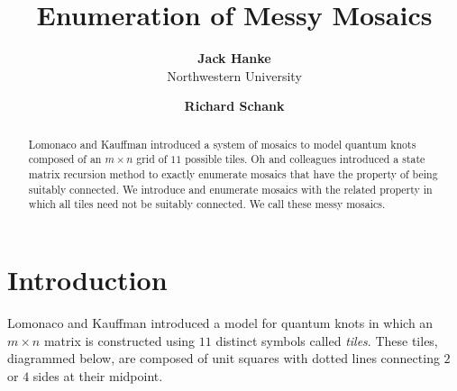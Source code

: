 \documentclass[12pt]{article}
\date{}
\author{
    \textbf{Jack Hanke}\\
    Northwestern University
    \and
    \textbf{Richard Schank}\\
    }
\title{\textbf{Enumeration of Messy Mosaics}}
\theoremstyle{plain}
\theoremstyle{definition}
\theoremstyle{remark}
\theoremstyle{definition}
\newcommand{\cell}[4]{ \draw[thick] ( #1 , #2 ) rectangle ( #3 , #4 );}
\newcommand{\cellA}[4]{\draw[red, thick, densely dotted] ( #1 + 0.5 , #2 ) arc(0:90:{0.5}); \draw[thick] ( #1 , #2 ) rectangle ( #3 , #4 );}
\newcommand{\cellB}[4]{\draw[red, thick, densely dotted] ( #1 + 1 , #2 + 0.5 ) arc(90:180:{0.5}); \draw[thick] ( #1 , #2 ) rectangle ( #3 , #4 );}
\newcommand{\cellC}[4]{\draw[red, thick, densely dotted] ( #1 + 0.5, #2 + 1 ) arc(180:270:{0.5}); \draw[thick] ( #1 , #2 ) rectangle ( #3 , #4 );}
\newcommand{\cellD}[4]{\draw[red, thick, densely dotted] ( #1 , #2 + 0.5 ) arc(-90:0:{0.5}); \draw[thick] ( #1 , #2 ) rectangle ( #3 , #4 );}
\newcommand{\cellE}[4]{\draw[red, thick, densely dotted] (#3, #4 * 0.5 + #2 * 0.5) -- (#1, #4 * 0.5 + #2 * 0.5); \draw[thick] ( #1 , #2 ) rectangle ( #3 , #4 );}
\newcommand{\cellF}[4]{\draw[red, thick, densely dotted] (#3 * 0.5 + #1 * 0.5 , #2) -- (#3 * 0.5 + #1 * 0.5 , #4); \draw[thick] ( #1 , #2 ) rectangle ( #3 , #4 );}
\newcommand{\cellG}[4]{\draw[red, thick, densely dotted] ( #1 + 0.5 , #2 ) arc(0:90:{0.5}); \draw[red, thick, densely dotted] ( #1 + 0.5, #2 + 1 ) arc(180:270:{0.5}); \draw[thick] ( #1 , #2 ) rectangle ( #3 , #4 );}
\newcommand{\cellH}[4]{\draw[red, thick, densely dotted] ( #1 , #2 + 0.5 ) arc(-90:0:{0.5}); \draw[red, thick, densely dotted] ( #1 + 1 , #2 + 0.5 ) arc(90:180:{0.5}); \draw[thick] ( #1 , #2 ) rectangle ( #3 , #4 );}
\newcommand{\cellI}[4]{\draw[red, thick, densely dotted] (#3 * 0.5 + #1 * 0.5 , #2) -- (#3 * 0.5 + #1 * 0.5 , #4); \node[shape=circle,draw=none,fill=white, inner sep=3pt,minimum size=5pt] (A) at ( #1 + 0.5 , #2 + 0.5 ) {}; \draw[red, thick, densely dotted] (#3, #4 * 0.5 + #2 * 0.5) -- (#1, #4 * 0.5 + #2 * 0.5); \draw[thick] ( #1 , #2 ) rectangle ( #3 , #4 );}
\newcommand{\cellJ}[4]{\draw[red, thick, densely dotted] (#3, #4 * 0.5 + #2 * 0.5) -- (#1, #4 * 0.5 + #2 * 0.5); \node[shape=circle,draw=none,fill=white, inner sep=3pt,minimum size=5pt] (A) at ( #1 + 0.5 , #2 + 0.5 ) {}; \draw[thick] ( #1 , #2 ) rectangle ( #3 , #4 ); \draw[red, thick, densely dotted] (#3 * 0.5 + #1 * 0.5 , #2) -- (#3 * 0.5 + #1 * 0.5 , #4);}
\newcommand{\lablnode}[3]{\node[shape=circle,draw=none,fill=none, inner sep=0pt,minimum size=5pt] (A) at ( #1 , #2 ) {#3};}
\begin{document}
\maketitle

\begin{center}

    \begin{abstract}
        Lomonaco and Kauffman introduced a system of mosaics to model quantum knots composed of an $m \times n$ grid of $11$ possible tiles. Oh and colleagues introduced a state matrix recursion method to exactly enumerate mosaics that have the property of being suitably connected. We introduce and enumerate mosaics with the related property in which all tiles need not be suitably connected. We call these messy mosaics.
    \end{abstract}

\end{center}

\section{Introduction}

Lomonaco and Kauffman \cite{Lomonaco08} introduced a model for quantum knots in which an $m \times n$ matrix is constructed using $11$ distinct symbols called \textit{tiles}. These tiles, diagrammed below, are composed of unit squares with dotted lines connecting $2$ or $4$ sides at their midpoint.

\begin{center}
\end{center}
\end{document}
